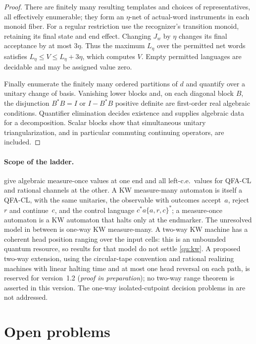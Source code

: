 \documentclass[11pt]{article}
\theoremstyle{plain}
\theoremstyle{definition}
\theoremstyle{remark}
\begin{document}
\begin{proof}
There are finitely many resulting templates and choices of representatives, all effectively enumerable; they form an $\eta$-net of actual-word instruments in each monoid fiber. For a regular restriction use the recognizer's transition monoid, retaining its final state and end effect. Changing $J_w$ by $\eta$ changes its final acceptance by at most $3\eta$. Thus the maximum $L_\eta$ over the permitted net words satisfies $L_\eta\le V\le L_\eta+3\eta$, which computes $V$. Empty permitted languages are decidable and may be assigned value zero.

Finally enumerate the finitely many ordered partitions of $d$ and quantify over a unitary change of basis. Vanishing lower blocks and, on each diagonal block $B$, the disjunction $B^*B=I$ or $I-B^*B$ positive definite are first-order real algebraic conditions. Quantifier elimination decides existence and supplies algebraic data for a decomposition. Scalar blocks show that simultaneous unitary triangularization, and in particular commuting continuing operators, are included.
\end{proof}

\paragraph{Scope of the ladder.}
 give algebraic measure-once values at one end and all left-c.e.\ values for QFA-CL and rational channels at the other. A KW measure-many automaton is itself a QFA-CL, with the same unitaries, the observable with outcomes accept~$a$, reject~$r$ and continue~$c$, and the control language $c^*a\{a,r,c\}^*$; a measure-once automaton is a KW automaton that halts only at the endmarker. The unresolved model in between is one-way KW measure-many. A two-way KW machine has a coherent head position ranging over the input cells: this is an unbounded quantum resource, so results for that model do not settle \cref{qu:kw}. A proposed two-way extension, using the circular-tape convention and rational realizing machines with linear halting time and at most one head reversal on each path, is reserved for version~1.2 (\emph{proof in preparation}); no two-way range theorem is asserted in this version. The one-way isolated-cutpoint decision problems in \cite[Section~2.2]{DJK05} are not addressed.


\section{Open problems}\label{sec:open}
\end{document}
